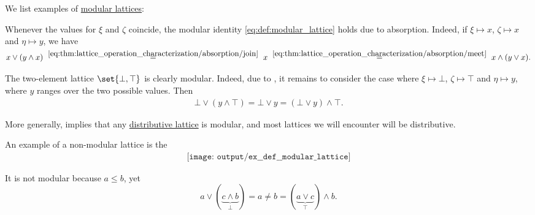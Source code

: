 \begin{example}\label{ex:def:modular_lattice}
  We list examples of \hyperref[def:modular_lattice]{modular lattices}:
  \begin{thmenum}
     Whenever the values for \( \xi \) and \( \zeta \) coincide, the modular identity \eqref{eq:def:modular_lattice} holds due to absorption. Indeed, if \( \xi \mapsto x \), \( \zeta \mapsto x \) and \( \eta \mapsto y \), we have
    \begin{equation*}
      x \vee (y \wedge x)
      \reloset {\eqref{eq:thm:lattice_operation_characterization/absorption/join}} =
      x
      \reloset {\eqref{eq:thm:lattice_operation_characterization/absorption/meet}} =
      x \wedge (y \vee x).
    \end{equation*}

     The two-element lattice \( \set{ \bot, \top } \) is clearly modular. Indeed, due to , it remains to consider the case where \( \xi \mapsto \bot \), \( \zeta \mapsto \top \) and \( \eta \mapsto y \), where \( y \) ranges over the two possible values. Then
    \begin{align*}
      \bot \vee (y \wedge \top)
      =
      \bot \vee y
      =
      (\bot \vee y) \wedge \top.
    \end{align*}

    More generally,  implies that any \hyperref[def:distributive_lattice]{distributive lattice} is modular, and most lattices we will encounter will be distributive.

     An example of a non-modular lattice is the 
    \begin{equation}\label{eq:ex:def:modular_lattice/pentagon}\tag{\( N_5 \)}
      \begin{aligned}
        \texttt{[image: output/ex\_\_def\_\_modular\_lattice]}
      \end{aligned}
    \end{equation}

    It is not modular because \( a \leq b \), yet
    \begin{equation*}
      a \vee (\underbrace{c \wedge b}_{\bot})
      =
      a
      \neq
      b
      =
      (\underbrace{a \vee c}_{\top}) \wedge b.
    \end{equation*}
  \end{thmenum}
\end{example}


